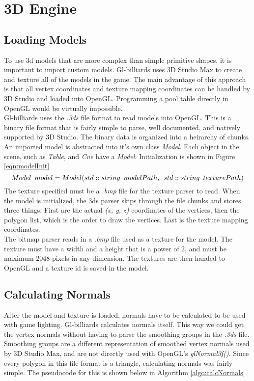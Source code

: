 
\section{3D Engine}

	\subsection{Loading Models}
	To use 3d models that are more complex than simple primitive shapes, it is important to import custom models. Gl-billiards uses 3D Studio Max to create 
and texture all of the models in the game. The main advantage of this approach is that all vertex coordinates and texture mapping coordinates can be handled 
by 3D Studio and loaded into OpenGL. Programming a pool table directly in OpenGL would be virtually impossible.\\
	Gl-billiards uses the \textit{.3ds} file format to read models into OpenGL. This is a binary file format that is fairly simple to parse, well documented, and 
natively supported by 3D Studio. The binary data is organized into a heirarchy of chunks. An imported model is abstracted into it's own class \textit{Model}. 
Each object in the scene, such as \textit{Table}, and \textit{Cue} have a \textit{Model}. Initialization is shown in Figure \ref{eqn:modelInit}
	\begin{equation}
	\label{eqn:modelInit}
	Model{\enskip}model = Model(std::string{\enskip}modelPath,{\enskip}std::string{\enskip}texturePath)
	\end{equation}
The texture specified must be a \textit{.bmp} file for the texture parser to read. When the model is initialized, the 3ds parser skips through the file chunks 
and stores three things. First are the actual \textit{(x, y, z)} coordinates of the vertices, then the polygon list, which is the order to draw the vertices. Last 
is the texture mapping coordinates.\\
	The bitmap parser reads in a \textit{.bmp} file used as a texture for the model. The texture must have a width and a height that is a power of $2$, 
and must be maximum $2048$ pixels in any dimension. The textures are then handed to OpenGL and a texture id is saved in the model.


	\subsection{Calculating Normals}
	After the model and texture is loaded, normals have to be calculated to be used with game lighting. Gl-billiards calculates normals itself. This way 
we could get the vertex normals without having to parse the smoothing groups in the \textit{.3ds} file. Smoothing groups are a different representation 
of smoothed vertex normals used by 3D Studio Max, and are not directly used with OpenGL's \textit{glNormal3f()}. Since every polygon in this file 
format is a triangle, calculating normals was fairly simple. 
The pseudocode for this is shown below in Algorithm \ref{algo:calcNormals}

